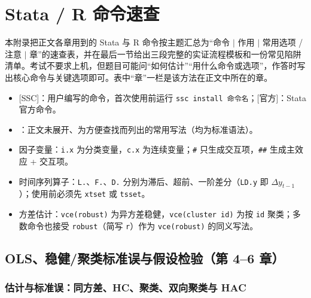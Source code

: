 \chapter{Stata / R 命令速查}
\label{ch:UappB-stata}

本附录把正文各章用到的 Stata 与 R 命令按主题汇总为“命令 $|$ 作用 $|$ 常用选项 / 注意 $|$ 章”的速查表，并在最后一节给出三段完整的实证流程模板和一份常见陷阱清单。考试不要求上机，但题目可能问“如何估计”“用什么命令或选项”，作答时写出核心命令与关键选项即可。表中“章”一栏是该方法在正文中所在的章。

\begin{summary}
\begin{itemize}
  \item {[SSC]}：用户编写的命令，首次使用前运行 \texttt{ssc install 命令名}；{[官方]}：Stata 官方命令。
  \item \tagext：正文未展开、为方便查找而列出的常用写法（均为标准语法）。
  \item 因子变量：\texttt{i.x} 为分类变量，\texttt{c.x} 为连续变量；\texttt{\#} 只生成交互项，\texttt{\#\#} 生成主效应 + 交互项。
  \item 时间序列算子：\texttt{L.}、\texttt{F.}、\texttt{D.} 分别为滞后、超前、一阶差分（\texttt{LD.y} 即 $\Delta y_{t-1}$）；使用前必须先 \texttt{xtset} 或 \texttt{tsset}。
  \item 方差估计：\texttt{vce(robust)} 为异方差稳健，\texttt{vce(cluster id)} 为按 \texttt{id} 聚类；多数命令也接受 \texttt{robust}（简写 \texttt{r}）作为 \texttt{vce(robust)} 的同义写法。
\end{itemize}
\end{summary}

\section{OLS、稳健/聚类标准误与假设检验（第 4–6 章）}\label{sec:UappB-ols}

\subsection{估计与标准误：同方差、HC、聚类、双向聚类与 HAC}

